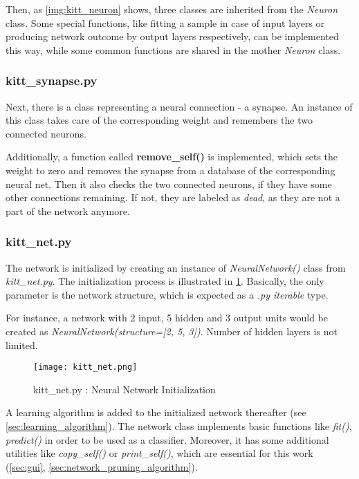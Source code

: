Then, as \cref{img:kitt_neuron} shows, three classes are inherited from the \textit{Neuron} class. Some special functions, like fitting a sample in case of input layers or producing network outcome by output layers respectively, can be implemented this way, while some common functions are shared in the mother \textit{Neuron} class.

\subsubsection*{kitt\_synapse.py} \label{ssec:kitt_synapse}
Next, there is a class representing a neural connection - a synapse. An instance of this class takes care of the corresponding weight and remembers the two connected neurons. 

Additionally, a function called \textbf{remove\_self()} is implemented, which sets the weight to zero and removes the synapse from a database of the corresponding neural net. Then it also checks the two connected neurons, if they have some other connections remaining. If not, they are labeled as \textit{dead}, as they are not a part of the network anymore.

\subsubsection*{kitt\_net.py} \label{ssec:kitt_net}
The network is initialized by creating an instance of \textit{NeuralNetwork()} class from \textit{kitt\_net.py}. The initialization process is illustrated in \cref{img:kitt_net}. Basically, the only parameter is the network structure, which is expected as a \textit{.py iterable} type. 

For instance, a network with 2 input, 5 hidden and 3 output units would be created as \textit{NeuralNetwork(structure=[2, 5, 3])}. Number of hidden layers is not limited.

\begin{figure}[H]
  \centering
  \texttt{[image: kitt\_net.png]}
  \caption{kitt\_net.py : Neural Network Initialization}
  \label{img:kitt_net}
\end{figure}

A learning algorithm is added to the initialized network thereafter (see \cref{sec:learning_algorithm}). The network class implements basic functions like \textit{fit()}, \textit{predict()} in order to be used as a classifier. Moreover, it has some additional utilities like \textit{copy\_self()} or \textit{print\_self()}, which are essential for this work (\cref{sec:gui}, \cref{sec:network_pruning_algorithm}).

